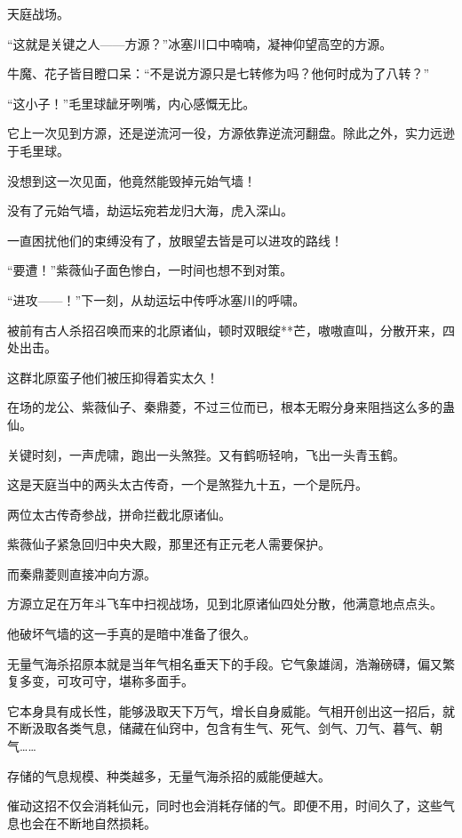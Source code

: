 
\begin{this_body}

天庭战场。

“这就是关键之人——方源？”冰塞川口中喃喃，凝神仰望高空的方源。

牛魔、花子皆目瞪口呆：“不是说方源只是七转修为吗？他何时成为了八转？”

“这小子！”毛里球龇牙咧嘴，内心感慨无比。

它上一次见到方源，还是逆流河一役，方源依靠逆流河翻盘。除此之外，实力远逊于毛里球。

没想到这一次见面，他竟然能毁掉元始气墙！

没有了元始气墙，劫运坛宛若龙归大海，虎入深山。

一直困扰他们的束缚没有了，放眼望去皆是可以进攻的路线！

“要遭！”紫薇仙子面色惨白，一时间也想不到对策。

“进攻——！”下一刻，从劫运坛中传呼冰塞川的呼啸。

被前有古人杀招召唤而来的北原诸仙，顿时双眼绽**芒，嗷嗷直叫，分散开来，四处出击。

这群北原蛮子他们被压抑得着实太久！

在场的龙公、紫薇仙子、秦鼎菱，不过三位而已，根本无暇分身来阻挡这么多的蛊仙。

关键时刻，一声虎啸，跑出一头煞狴。又有鹤呖轻响，飞出一头青玉鹤。

这是天庭当中的两头太古传奇，一个是煞狴九十五，一个是阮丹。

两位太古传奇参战，拼命拦截北原诸仙。

紫薇仙子紧急回归中央大殿，那里还有正元老人需要保护。

而秦鼎菱则直接冲向方源。

方源立足在万年斗飞车中扫视战场，见到北原诸仙四处分散，他满意地点点头。

他破坏气墙的这一手真的是暗中准备了很久。

无量气海杀招原本就是当年气相名垂天下的手段。它气象雄阔，浩瀚磅礴，偏又繁复多变，可攻可守，堪称多面手。

它本身具有成长性，能够汲取天下万气，增长自身威能。气相开创出这一招后，就不断汲取各类气息，储藏在仙窍中，包含有生气、死气、剑气、刀气、暮气、朝气……

存储的气息规模、种类越多，无量气海杀招的威能便越大。

催动这招不仅会消耗仙元，同时也会消耗存储的气。即便不用，时间久了，这些气息也会在不断地自然损耗。


\end{this_body}
